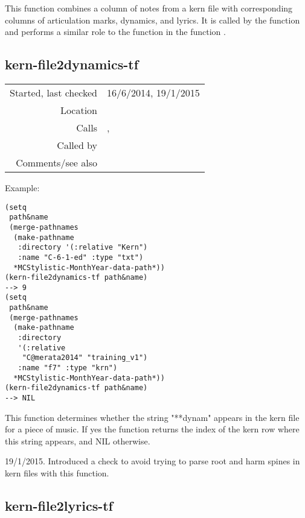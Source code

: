 \noindent This function combines a column of notes
from a kern file with corresponding columns of
articulation marks, dynamics, and lyrics. It is
called by the function
 and
performs a similar role to the function
 in the function
.


\subsection*{kern-file2dynamics-tf}\label{fun:kern-file2dynamics-tf}

\vspace{0.3cm}
\begin{tabular}{r|p{8cm}}
Started, last checked & 16/6/2014, 19/1/2015 \\
Location & \nameref{sec:kern-articulation} \\
Calls & \nameref{fun:read-from-file-arbitrary},\newline \nameref{fun:tab-separated-string2list} \\
Called by & \nameref{fun:kern-file2points-artic-dynam-lyrics} \\
Comments/see also &
\end{tabular}

\vspace{0.5cm}
\noindent Example:
\begin{verbatim}
(setq
 path&name
 (merge-pathnames
  (make-pathname
   :directory '(:relative "Kern")
   :name "C-6-1-ed" :type "txt")
  *MCStylistic-MonthYear-data-path*))
(kern-file2dynamics-tf path&name)
--> 9
(setq
 path&name
 (merge-pathnames
  (make-pathname
   :directory
   '(:relative
    "C@merata2014" "training_v1")
   :name "f7" :type "krn")
  *MCStylistic-MonthYear-data-path*))
(kern-file2dynamics-tf path&name)
--> NIL
\end{verbatim}

\noindent This function determines whether the string
"**dynam" appears in the kern file for a piece of
music. If yes the function returns the index of the
kern row where this string appears, and NIL
otherwise.

19/1/2015. Introduced a check to avoid trying to parse
root and harm spines in kern files with this
function.


\subsection*{kern-file2lyrics-tf}\label{fun:kern-file2lyrics-tf}

